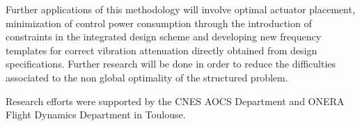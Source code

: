 \documentclass{ifacconf}
\begin{document}
Further applications of this methodology will involve optimal actuator placement, minimization of control power consumption through the introduction of  constraints in the integrated design scheme and developing new frequency templates for correct vibration attenuation directly obtained from design specifications. Further research will be done in order to reduce the difficulties associated to the non global optimality of the   structured  problem.

\begin{ack}
Research efforts were supported by the CNES AOCS Department and ONERA Flight Dynamics Department in Toulouse.
\end{ack}

             
\end{document}
